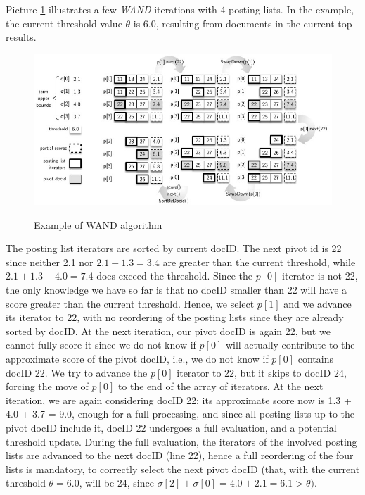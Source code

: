 Picture \ref{wand ex} illustrates a few \textit{WAND} iterations with 4 posting lists. In the example, the current threshold value $\theta$ is 6.0, resulting from documents in the current top results. 

\begin{figure}[h!]
		\centering
		\includegraphics[scale = 1.8]{img/WAND example.jpg}
        \label{wand ex}
        \caption{Example of WAND algorithm}
\end{figure}

The posting list iterators are sorted by current docID. The next pivot id is 22 since neither 2.1 nor $2.1 + 1.3 = 3.4$ are greater than the current threshold, while $2.1 + 1.3 + 4.0 = 7.4$ does exceed the threshold. Since the $p[0]$ iterator is not 22, the only knowledge we have so far is that no docID smaller than 22 will have a score greater than the current threshold. Hence, we select $p[1]$ and we advance its iterator to 22, with no reordering of the posting lists since they are already sorted by docID. At the next iteration, our pivot docID is again 22, but we cannot fully score it since we do not know if $p[0]$ will actually contribute to the approximate score of the pivot docID, i.e., we do not know if $p[0]$ contains docID 22. We try to advance the $p[0]$ iterator to 22, but it skips to docID 24, forcing the move of $p[0]$ to the end of the array of iterators. At the next iteration, we are again considering docID 22: its approximate score now is 1.3 + 4.0 + 3.7 = 9.0, enough for a full processing, and since all posting lists up to the pivot docID include it, docID 22 undergoes a full evaluation, and a potential threshold update. During the full evaluation, the iterators of the involved posting lists are advanced to the next docID (line 22), hence a full reordering of the four lists is mandatory, to correctly select the next pivot docID (that, with the current threshold $\theta = 6.0$, will be 24, since $\sigma[2] + \sigma[0] = 4.0 + 2.1 = 6.1 > \theta)$.

